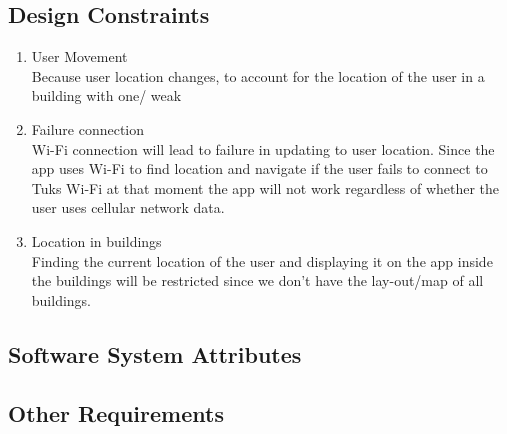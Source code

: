 \documentclass[a4paper,10pt]{article}
\begin{document}
	\subsection{Design Constraints}
		\begin{enumerate}
		\item 	User Movement \\
Because user location changes, to account for the location of the user in a building with one/ weak 
			
		\item 	Failure connection \\
Wi-Fi connection will lead to failure in updating to user location. Since the app uses Wi-Fi to find location and navigate if the user fails to connect to Tuks Wi-Fi at that moment the app will not work regardless of whether the user uses cellular network data.	
					
		\item Location in buildings \\
Finding the current location of the user and displaying it on the app inside the buildings will be restricted since we don't have the lay-out/map of all buildings.	
		\end{enumerate}				

	\subsection{Software System Attributes}
	\subsection{Other Requirements}
\end{document}
